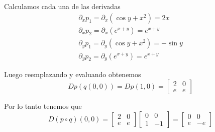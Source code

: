 \documentclass[a4paper,oneside,10.5pt]{article}
\begin{document}
\begin{sol}
Calculamos cada una de las derivadas
\begin{gather*}
    \partial_x p_1 = \partial_x (\cos y + x^2) = 2x\\
    \partial_x p_2 = \partial_x (e^{x + y}) = e^{x + y}\\
    \partial_y p_1 = \partial_y (\cos y + x^2) = -\sin y\\
    \partial_y p_2 = \partial_y (e^{x + y}) = e^{x + y}
\end{gather*}

Luego reemplazando y evaluando obtenemos
\begin{equation*}
    Dp(q(0, 0)) = Dp(1, 0) = \begin{bmatrix}
        2 & 0\\
        e & e
    \end{bmatrix}
\end{equation*}

Por lo tanto tenemos que
\begin{equation*}
    D(p \circ q)(0, 0) = \begin{bmatrix}
        2 & 0\\
        e & e
    \end{bmatrix}\begin{bmatrix}
        0 & 0\\
        1 & -1
    \end{bmatrix} = \begin{bmatrix}
        0 & 0\\ e & -e
    \end{bmatrix}
\end{equation*}
\end{sol}
\end{document}
